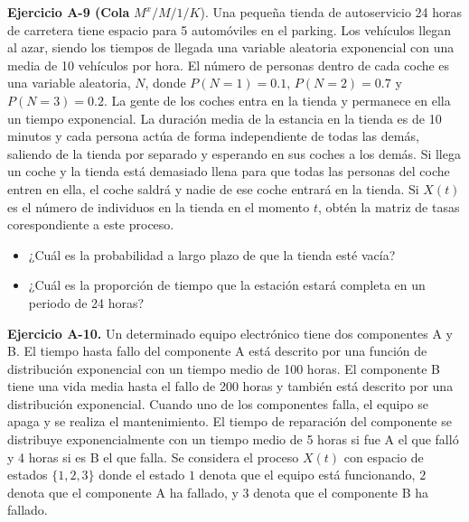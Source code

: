 \documentclass[
]{book}
\providecommand{\tightlist}{%
  \setlength{\itemsep}{0pt}\setlength{\parskip}{0pt}}
\theoremstyle{definition}
\theoremstyle{definition}
\theoremstyle{definition}
\theoremstyle{definition}
\theoremstyle{remark}
\begin{document}
\textbf{Ejercicio A-9 (Cola} \(M^x/M/1/K\)). Una pequeña tienda de autoservicio 24 horas de carretera tiene espacio para 5 automóviles en el parking. Los vehículos llegan al azar, siendo los tiempos de llegada una variable aleatoria exponencial con una media de 10 vehículos por hora. El número de personas dentro de cada coche es una variable aleatoria, \(N\), donde \(P(N = 1) = 0.1\), \(P(N = 2) = 0.7\) y \(P(N = 3) = 0.2\). La gente de los coches entra en la tienda y permanece en ella un tiempo exponencial. La duración media de la estancia en la tienda es de 10 minutos y cada persona actúa de forma independiente de todas las demás, saliendo de la tienda por separado y esperando en sus coches a los demás. Si llega un coche y la tienda está demasiado llena para que todas las personas del coche entren en ella, el coche saldrá y nadie de ese coche entrará en la tienda. Si \(X(t)\) es el número de individuos en la tienda en el momento \(t\), obtén la matriz de tasas corespondiente a este proceso.

\begin{itemize}
\tightlist
\item
  ¿Cuál es la probabilidad a largo plazo de que la tienda esté vacía?
\item
  ¿Cuál es la proporción de tiempo que la estación estará completa en un periodo de 24 horas?
\end{itemize}

\textbf{Ejercicio A-10.} Un determinado equipo electrónico tiene dos componentes A y B. El tiempo hasta fallo del componente A está descrito por una función de distribución exponencial con un tiempo medio de 100 horas. El componente B tiene una vida media hasta el fallo de 200 horas y también está descrito por una distribución exponencial. Cuando uno de los componentes falla, el equipo se apaga y se realiza el mantenimiento. El tiempo de reparación del componente se distribuye exponencialmente con un tiempo medio de 5 horas si fue A el que falló y 4 horas si es B el que falla. Se considera el proceso \(X(t)\) con espacio de estados \(\{1, 2, 3\}\) donde el estado \(1\) denota que el equipo está funcionando, \(2\) denota que el componente A ha fallado, y \(3\) denota que el componente B ha fallado.
\end{document}
